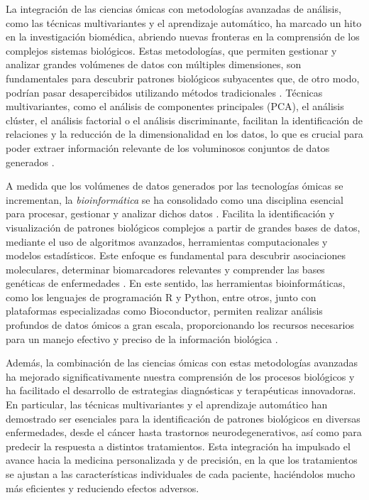 La integración de las ciencias ómicas con metodologías avanzadas de análisis, como las técnicas multivariantes 
y el aprendizaje automático, ha marcado un hito en la investigación biomédica, abriendo nuevas fronteras en la 
comprensión de los complejos sistemas biológicos. Estas metodologías, que permiten gestionar y analizar grandes 
volúmenes de datos con múltiples dimensiones, son fundamentales para descubrir patrones biológicos subyacentes 
que, de otro modo, podrían pasar desapercibidos utilizando métodos tradicionales \cite{tarca}. Técnicas multivariantes, como 
el análisis de componentes principales (PCA), el análisis clúster, el análisis factorial o el análisis discriminante, 
facilitan la identificación de relaciones y la reducción de la dimensionalidad en los datos, lo que es crucial para 
poder extraer información relevante de los voluminosos conjuntos de datos generados \cite{intro-1}.\newline

A medida que los volúmenes de datos generados por las tecnologías ómicas se incrementan, la \textit{bioinformática} se ha 
consolidado como una disciplina esencial para procesar, gestionar y analizar dichos datos \cite{kaneshia}. Facilita la identificación y 
visualización de patrones biológicos complejos a partir de grandes bases de datos, mediante el uso de algoritmos avanzados,
herramientas computacionales y modelos estadísticos. Este enfoque es fundamental para descubrir asociaciones moleculares, 
determinar biomarcadores relevantes y comprender las bases genéticas de enfermedades \cite{koh}. En este sentido, las herramientas
bioinformáticas, como los lenguajes de programación R y Python, entre otros, junto con plataformas especializadas como Bioconductor, 
permiten realizar análisis profundos de datos ómicos a gran escala, proporcionando los recursos necesarios para un 
manejo efectivo y preciso de la información biológica \cite{bioconductor-1}. \newline

Además, la combinación de las ciencias ómicas con estas metodologías avanzadas ha mejorado significativamente 
nuestra comprensión de los procesos biológicos y ha facilitado el desarrollo de estrategias diagnósticas y terapéuticas 
innovadoras. En particular, las técnicas multivariantes y el aprendizaje automático han demostrado ser esenciales 
para la identificación de patrones biológicos en diversas enfermedades, desde el cáncer hasta trastornos neurodegenerativos, 
así como para predecir la respuesta a distintos tratamientos. Esta integración ha impulsado el avance hacia la medicina 
personalizada y de precisión, en la que los tratamientos se ajustan a las características individuales de cada paciente, 
haciéndolos mucho más eficientes y reduciendo efectos adversos. \newline

